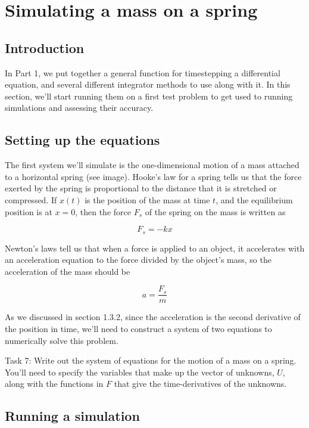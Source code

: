 \documentclass[main.tex]{subfiles}
\begin{document}
\chapter{Simulating a mass on a spring}

\section{Introduction}

In Part 1, we put together a general function for timestepping a differential equation, and several different integrator methods to use along with it.
In this section, we'll start running them on a first test problem to get used to running simulations and assessing their accuracy.

\section{Setting up the equations}

The first system we'll simulate is the one-dimensional motion of a mass attached to a horizontal spring (see image).
Hooke's law for a spring tells us that the force exerted by the spring is proportional to the distance that it is stretched or compressed.
If $x(t)$ is the position of the mass at time $t$, and the equilibrium position is at $x=0$, then the force $F_s$ of the spring on the mass is written as

\begin{equation}
    F_s = - k x
\end{equation}

Newton's laws tell us that when a force is applied to an object, it accelerates with an acceleration equation to the force divided by the object's mass, so the acceleration of the mass should be

\begin{equation}
    a = \frac{F_s}{m}
\end{equation}

As we discussed in section 1.3.2, since the acceleration is the second derivative of the position in time, we'll need to construct a system of two equations to numerically solve this problem.

Task 7: Write out the system of equations for the motion of a mass on a spring.
You'll need to specify the variables that make up the vector of unknowns, $U$, along with the functions in $F$ that give the time-derivatives of the unknowns.

\section{Running a simulation}
\end{document}
